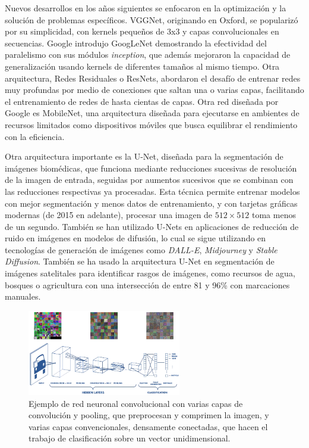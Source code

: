 Nuevos desarrollos en los años siguientes se enfocaron en la optimización y la solución de problemas específicos. VGGNet, originando en Oxford, se popularizó por su simplicidad, con kernels pequeños de 3x3 y capas convolucionales en secuencias. Google introdujo GoogLeNet demostrando la efectividad del paralelismo con sus módulos {\it inception}, que además mejoraron la capacidad de generalización usando kernels de diferentes tamaños al mismo tiempo. Otra arquitectura, Redes Residuales o ResNets, abordaron el desafío de entrenar redes muy profundas por medio de conexiones que saltan una o varias capas, facilitando el entrenamiento de redes de hasta cientas de capas. Otra red diseñada por Google es MobileNet, una arquitectura diseñada para ejecutarse en ambientes de recursos limitados como dispositivos móviles que busca equilibrar el rendimiento con la eficiencia.

Otra arquitectura importante es la U-Net, diseñada para la segmentación de imágenes biomédicas, que funciona mediante reducciones sucesivas de resolución de la imagen de entrada, seguidas por aumentos sucesivos que se combinan con las reducciones respectivas ya procesadas. Esta técnica permite entrenar modelos con mejor segmentación y menos datos de entrenamiento, y con tarjetas gráficas modernas (de 2015 en adelante), procesar una imagen de $512 \times 512$ toma menos de un segundo. \autocite{ronneberger2015unetconvolutionalnetworksbiomedical} También se han utilizado U-Nets en aplicaciones de reducción de ruido en imágenes en modelos de difusión, lo cual se sigue utilizando en tecnologías de generación de imágenes como {\it DALL-E}, {\it Midjourney} y {\it Stable Diffusion}. \autocite{ho2020denoising} También se ha usado la arquitectura U-Net en segmentación de imágenes satelitales para identificar rasgos de imágenes, como recursos de agua, bosques o agricultura con una intersección de entre 81 y 96\% con marcaciones manuales. \autocite{khryashchev2018}

\begin{figure}
    \centering
    \includegraphics[width=0.6\textwidth]{img/cnn-figure.png}
    \caption{Ejemplo de red neuronal convolucional con varias capas de convolución y pooling, que preprocesan y comprimen la imagen, y varias capas convencionales, densamente conectadas, que hacen el trabajo de clasificación sobre un vector unidimensional.}
    \label{fig:2}
\end{figure}


